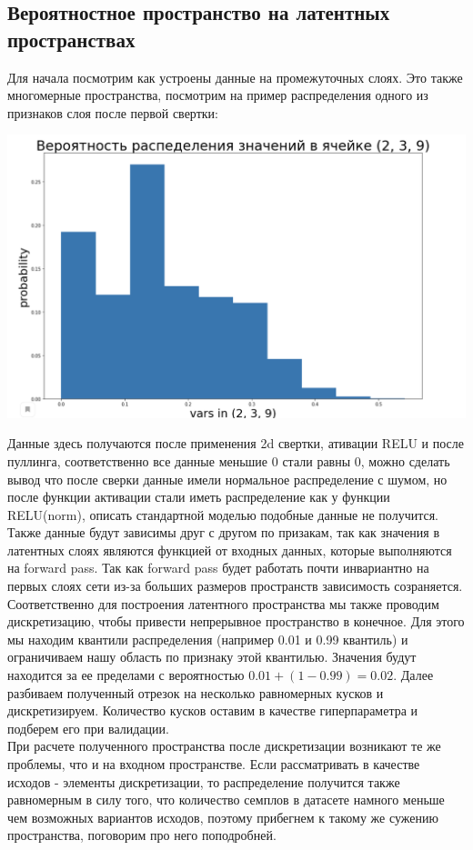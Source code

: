\subsection{Вероятностное пространство на латентных пространствах}
Для начала посмотрим как устроены данные на промежуточных слоях. Это также многомерные пространства, посмотрим на пример распределения одного из признаков слоя после первой свертки:
\begin{center}
    \includegraphics[scale=0.4]{images/Z1_dist.png}
\end{center}
Данные здесь получаются после применения 2d свертки, ативации RELU и после пуллинга, соответственно все данные меньшие 0 стали равны 0, можно сделать вывод что после сверки данные имели нормальное распределение с шумом, но после функции активации стали иметь распределение как у функции RELU(norm), описать стандартной моделью подобные данные не получится. \\
Также данные будут зависимы друг с другом по призакам, так как значения в латентных слоях являются функцией от входных данных, которые выполняются на forward pass. Так как forward pass будет работать почти инвариантно на первых слоях сети из-за больших размеров пространств зависимость созраняется. \\
Соответственно для построения латентного пространства мы также проводим дискретизацию, чтобы привести непрерывное пространство в конечное. Для этого мы находим квантили распределения (например 0.01 и 0.99 квантиль) и ограничиваем нашу область по признаку этой квантилью. Значения будут находится за ее пределами с вероятностью $0.01 + (1 - 0.99) = 0.02$. Далее разбиваем полученный отрезок на несколько равномерных кусков и дискретизируем. Количество кусков оставим в качестве гиперпараметра и подберем его при валидации. \\
При расчете полученного пространства после дискретизации возникают те же проблемы, что и на входном пространстве. Если рассматривать в качестве исходов - элементы дискретизации, то распределение получится также равномерным в силу того, что количество семплов в датасете намного меньше чем возможных вариантов исходов, поэтому прибегнем к такому же сужению пространства, поговорим про него поподробней.
